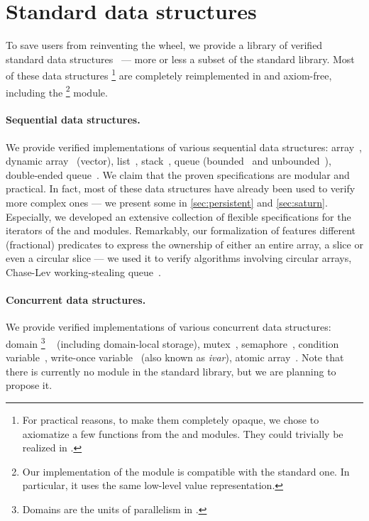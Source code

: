 \section{Standard data structures}
\label{sec:std}

To save users from reinventing the wheel, we provide a library of verified standard data structures~ --- more or less a subset of the \OCaml standard library.
Most of these data structures%
\footnote{
For practical reasons, to make them completely opaque, we chose to axiomatize a few functions from the  and  modules.
They could trivially be realized in \Zoo.
}
are completely reimplemented in \Zoo and axiom-free, including the %
\footnote{
Our implementation of the  module is compatible with the standard one.
In particular, it uses the same low-level value representation.
}
module.

\paragraph{Sequential data structures.}

We provide verified implementations of various sequential data structures: array~, dynamic array~ (vector), list~, stack~, queue (bounded~ and unbounded~), double-ended queue~.
We claim that the proven specifications are modular and practical.
In fact, most of these data structures have already been used to verify more complex ones --- we present some in \cref{sec:persistent} and \cref{sec:saturn}.
Especially, we developed an extensive collection of flexible specifications for the iterators of the  and  modules.
Remarkably, our formalization of  features different (fractional) predicates to express the ownership of either an entire array, a slice or even a circular slice --- we used it to verify algorithms involving circular arrays, \eg Chase-Lev working-stealing queue~\citep{DBLP:conf/spaa/ChaseL05}.

\paragraph{Concurrent data structures.}

We provide verified implementations of various concurrent data structures: domain%
\footnote{
Domains are the units of parallelism in \OCamlFive.
}%
~
(including domain-local storage), mutex~, semaphore~, condition variable~, write-once variable~ (also known as \emph{ivar}), atomic array~.
Note that there is currently no  module in the \OCaml standard library, but we are planning to propose it.
